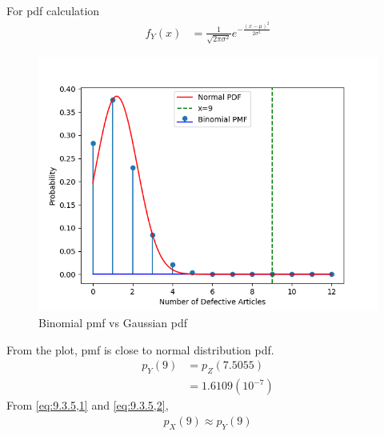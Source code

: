 \documentclass[journal,12pt,twocolumn]{IEEEtran}
\theoremstyle{remark}
\begin{document}
For pdf calculation
\begin{align}
f_Y(x)&=\frac{1}{\sqrt{2\pi\sigma^2}}e^{-\frac{(x-\mu)^2}{2\sigma^2}}
\end{align}
\begin{figure}[!ht]
\centering
\includegraphics[width=\columnwidth]{figs/figure.png}
\caption{Binomial pmf vs Gaussian pdf }
\label{fig:9.3.5}
\end{figure}
From the plot, pmf is close to normal distribution pdf.
\begin{align}
p_Y(9)&=p_Z(7.5055)\\
&=1.6109(10^{-7})
\label{eq:9.3.5,2}
\end{align}
From \eqref{eq:9.3.5,1} and \eqref{eq:9.3.5,2},
\begin{align}
p_X(9)\approx p_Y(9)
\end{align}
\end{document}
